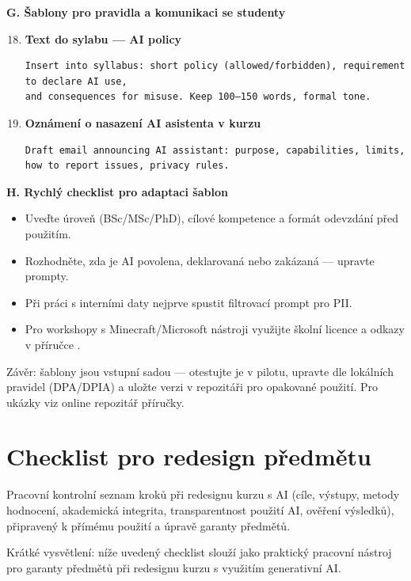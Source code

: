 \documentclass{report}%
\begin{document}
\textbf{G. Šablony pro pravidla a komunikaci se studenty}

\begin{enumerate}
  \setcounter{enumi}{17}
  \item \textbf{Text do sylabu — AI policy}
  \begin{verbatim}
Insert into syllabus: short policy (allowed/forbidden), requirement to declare AI use,
and consequences for misuse. Keep 100–150 words, formal tone.
  \end{verbatim}
  \item \textbf{Oznámení o nasazení AI asistenta v kurzu}
  \begin{verbatim}
Draft email announcing AI assistant: purpose, capabilities, limits, how to report issues, privacy rules.
  \end{verbatim}
\end{enumerate}

\medskip

\textbf{H. Rychlý checklist pro adaptaci šablon}

\begin{itemize}
  \item Uveďte úroveň (BSc/MSc/PhD), cílové kompetence a formát odevzdání před použitím.
  \item Rozhodněte, zda je AI povolena, deklarovaná nebo zakázaná — upravte prompty.
  \item Při práci s interními daty nejprve spustit filtrovací prompt pro PII.
  \item Pro workshopy s Minecraft/Microsoft nástroji využijte školní licence a odkazy v příručce \cite{kb_ai_101_tipu_pdf_04e4a115_page_15_2, kb_ai_101_tipu_pdf_04e4a115_page_8_1}.
\end{itemize}

\medskip

Závěr: šablony jsou vstupní sadou — otestujte je v pilotu, upravte dle lokálních pravidel (DPA/DPIA) a uložte verzi v repozitáři pro opakované použití. Pro ukázky viz online repozitář příručky.%

%
\section{Checklist pro redesign předmětu}%
Pracovní kontrolní seznam kroků při redesignu kurzu s AI (cíle, výstupy, metody hodnocení, akademická integrita, transparentnost použití AI, ověření výsledků), připravený k přímému použití a úpravě garanty předmětů.%


%
Krátké vysvětlení: níže uvedený checklist slouží jako praktický pracovní nástroj pro garanty předmětů při redesignu kurzu s využitím generativní AI.
\end{document}
